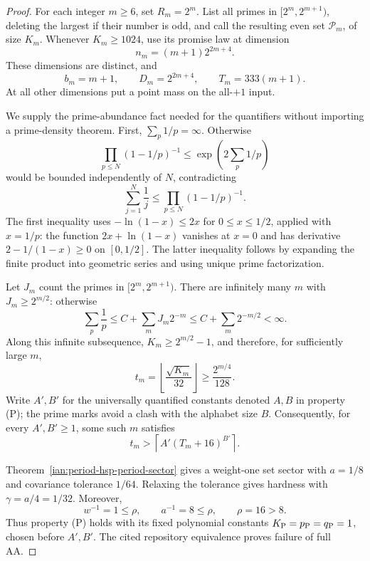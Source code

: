 \begin{proof}
For each integer \(m\ge6\), set \(R_m=2^m\). List all primes in
\([2^m,2^{m+1})\), deleting the largest if their number is odd, and call the resulting even set \(\mathcal P_m\), of size \(K_m\).
Whenever \(K_m\ge1024\), use its promise law at dimension
\[
 n_m=(m+1)2^{2m+4}.
\]
These dimensions are distinct, and
\[
 b_m=m+1,\qquad D_m=2^{2m+4},\qquad T_m=333(m+1).
\]
At all other dimensions put a point mass on the all-\(+1\) input.

We supply the prime-abundance fact needed for the quantifiers without importing a prime-density theorem. First,
\(\sum_p1/p=\infty\). Otherwise
\[
 \prod_{p\le N}(1-1/p)^{-1}
 \le \exp\left(2\sum_p1/p\right)
\]
would be bounded independently of \(N\), contradicting
\[
 \sum_{j=1}^N\frac1j
 \le\prod_{p\le N}(1-1/p)^{-1}.
\]
The first inequality uses \(-\ln(1-x)\le2x\) for \(0\le x\le1/2\), applied with \(x=1/p\): the function \(2x+\ln(1-x)\) vanishes at \(x=0\) and has derivative \(2-1/(1-x)\ge0\) on \([0,1/2]\).
The latter inequality follows by expanding the finite product into geometric series and using unique prime factorization.

Let \(J_m\) count the primes in \([2^m,2^{m+1})\).
There are infinitely many \(m\) with \(J_m\ge2^{m/2}\): otherwise
\[
 \sum_p\frac1p
 \le C+\sum_m J_m2^{-m}
 \le C+\sum_m2^{-m/2}<\infty.
\]
Along this infinite subsequence,
\(K_m\ge2^{m/2}-1\), and therefore, for sufficiently large \(m\),
\[
 t_m=\left\lfloor\frac{\sqrt{K_m}}{32}\right\rfloor
 \ge\frac{2^{m/4}}{128}.
\]
Write \(A',B'\) for the universally quantified constants denoted \(A,B\) in property (P); the prime marks avoid a clash with the alphabet size \(B\).
Consequently, for every \(A',B'\ge1\), some such \(m\) satisfies
\[
 t_m>\left\lceil A'(T_m+16)^{B'}\right\rceil.
\]

Theorem~\ref{ian:period-hsp-period-sector} gives a weight-one set sector with \(a=1/8\) and covariance tolerance \(1/64\). Relaxing the tolerance gives hardness with \(\gamma=a/4=1/32\).
Moreover,
\[
 w^{-1}=1\le\rho,\qquad a^{-1}=8\le\rho,\qquad \rho=16>8.
\]
Thus property (P) holds with its fixed polynomial constants
\(K_{\rm P}=p_{\rm P}=q_{\rm P}=1\), chosen before \(A',B'\).
The cited repository equivalence proves failure of full AA.
\end{proof}

